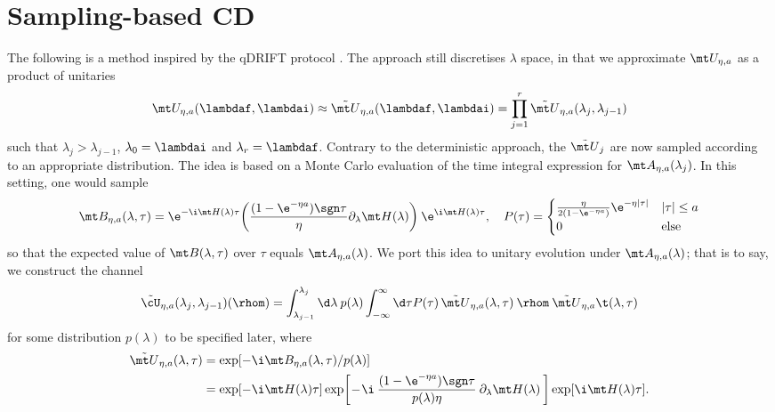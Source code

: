 \section{Sampling-based CD}
The following is a method inspired by the qDRIFT protocol \cite{}. The approach still discretises $\lambda$ space, in that we approximate $\mt U_{\eta, a}$ as a product of unitaries
\begin{align}
    \mt U_{\eta, a}(\lambdaf, \lambdai) \approx \tilde{\mt U}_{\eta, a}(\lambdaf, \lambdai) = \prod_{j=1}^r \tilde{\mt U}_{\eta, a}(\lambda_j, \lambda_{j-1})
\end{align}
such that $\lambda_j > \lambda_{j-1}$, $\lambda_0 = \lambdai$ and $\lambda_r = \lambdaf$. Contrary to the deterministic approach, the $\tilde{\mt U}_j$ are now sampled according to an appropriate distribution. The idea is based on a Monte Carlo evaluation of the time integral expression for $\mt A_{\eta, a}(\lambda_j)$. In this setting, one would sample
\begin{align}
    \mt B_{\eta, a}(\lambda, \tau) = \e^{-\i \mt H(\lambda) \tau} \bigg( \frac{(1 - \e^{-\eta a})\sgn\tau}\eta \partial_\lambda \mt H(\lambda) \bigg) \> \e^{\i \mt H(\lambda) \tau}, \quad P(\tau) = \begin{cases} \frac\eta{2(1 - \e^{-\eta a})} \e^{-\eta|\tau|} & |\tau| \leq a \\ 0 & \text{else}\end{cases}
\end{align}
so that the expected value of $\mt B(\lambda, \tau)$ over $\tau$ equals $\mt A_{\eta, a}(\lambda)$. We port this idea to unitary evolution under $\mt A_{\eta, a}(\lambda)$; that is to say, we construct the channel
\begin{align}
    \tilde\cU_{\eta, a}(\lambda_j, \lambda_{j-1})(\rhom) = \int_{\lambda_{j-1}}^{\lambda_j} \d\lambda \> p(\lambda) \int_{-\infty}^{\infty} \d\tau P(\tau) \, \tilde{\mt U}_{\eta, a}(\lambda, \tau) \> \rhom \> \tilde{\mt U}_{\eta, a}\t(\lambda, \tau)
\end{align}
for some distribution $p(\lambda)$ to be specified later, where
\begin{align}
    \tilde{\mt U}_{\eta, a}(\lambda, \tau) &= \exp[-\i \mt B_{\eta, a}(\lambda, \tau) / p(\lambda)] \nonumber \\
    &= \exp[-\i \mt H(\lambda) \tau] \exp \! \bigg[ \!-\!\i \> \frac{(1 - \e^{-\eta a})\sgn\tau}{p(\lambda)\eta} \> \partial_\lambda \mt H(\lambda)\> \bigg] \exp[\i \mt H(\lambda)\tau].
\end{align}

